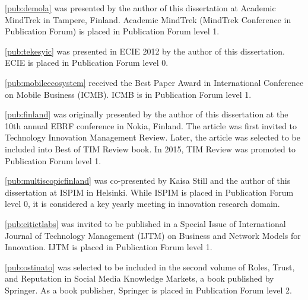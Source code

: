 \begin{midsloppypar}
\ref{pub:demola} was presented by the author of this dissertation at Academic MindTrek in Tampere, Finland. Academic MindTrek (MindTrek Conference in Publication Forum) is placed in Publication Forum level 1.

\ref{pub:tekesyic} was presented in ECIE 2012 by the author of this dissertation. ECIE is placed in Publication Forum level 0.

\ref{pub:mobileecosystem} received the Best Paper Award in International Conference on Mobile Business (ICMB). ICMB is in Publication Forum level 1.

\ref{pub:finland} was originally presented by the author of this dissertation at the 10th annual EBRF conference in Nokia, Finland. The article was first invited to Technology Innovation Management Review. Later, the article was selected to be included into Best of TIM Review book. In 2015, TIM Review was promoted to Publication Forum level 1.

\ref{pub:multiscopicfinland} was co-presented by Kaisa Still and the author of this dissertation at ISPIM in Helsinki. While ISPIM is placed in Publication Forum level 0, it is considered a key yearly meeting in innovation research domain.

\ref{pub:eitictlabs} was invited to be published in a Special Issue of International Journal of Technology Management (IJTM) on Business and Network Models for Innovation. IJTM is placed in Publication Forum level 1.

\ref{pub:ostinato} was selected to be included in the second volume of Roles, Trust, and Reputation in Social Media Knowledge Markets, a book published by Springer. As a book publisher, Springer is placed in Publication Forum level 2.

\end{midsloppypar}